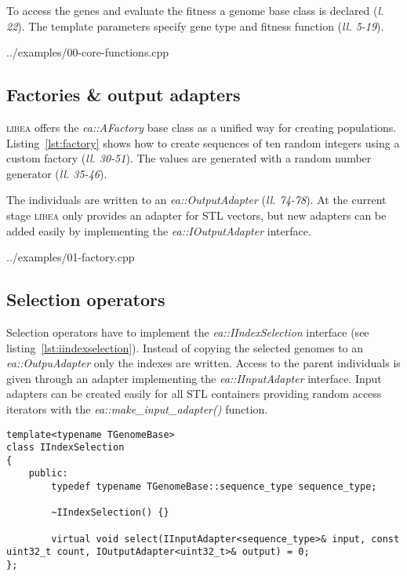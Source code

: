 \documentclass[a4paper]{article}
\begin{document}
To access the genes and evaluate the fitness a genome base class is declared (\textit{l. 22}). The template parameters specify gene type and fitness function (\textit{ll. 5-19}).

\begin{lstinputlisting}[caption=core functions,label=lst:core-functions]{../examples/00-core-functions.cpp}
\end{lstinputlisting}

\subsection{Factories \& output adapters}

\textsc{libea} offers the \textit{ea::AFactory} base class as a unified way for creating populations. Listing~\ref{lst:factory} shows how to create sequences of ten random integers using a custom factory (\textit{ll. 30-51}). The values are generated with a random number generator (\textit{ll. 35-46}).

The individuals are written to an \textit{ea::OutputAdapter} (\textit{ll. 74-78}). At the current stage \textsc{libea} only provides an adapter for STL vectors, but new adapters can be added easily by implementing the \textit{ea::IOutputAdapter} interface.

\begin{lstinputlisting}[caption=custom factory,label=lst:factory]{../examples/01-factory.cpp}
\end{lstinputlisting}

\subsection{Selection operators}

Selection operators have to implement the \textit{ea::IIndexSelection} interface (see listing~\ref{lst:iindexselection}). Instead of copying the selected genomes to an \textit{ea::OutpuAdapter} only the indexes are written. Access to the parent individuals is given through an adapter implementing the \textit{ea::IInputAdapter} interface. Input adapters can be created easily for all STL containers providing random access iterators with the \textit{ea::make\_input\_adapter()} function.

\begin{lstlisting}[caption=IIndexSelection,label=lst:iindexselection]
template<typename TGenomeBase>
class IIndexSelection
{
	public:
		typedef typename TGenomeBase::sequence_type sequence_type;

		~IIndexSelection() {}

		virtual void select(IInputAdapter<sequence_type>& input, const uint32_t count, IOutputAdapter<uint32_t>& output) = 0;
};
\end{lstlisting}
\end{document}
